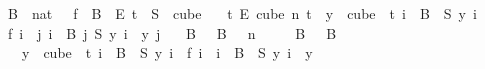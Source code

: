 \begin{isabellebody}
\ \ {\isasymnotin}\ B\ {\isacharbackquote}{\kern0pt}\ {\isacharbraceleft}{\kern0pt}{\isachardot}{\kern0pt}{\isachardot}{\kern0pt}{\isacharless}{\kern0pt}{}{\isacharcolon}{\kern0pt}{\isacharcolon}{\kern0pt}nat{\isacharbraceright}{\kern0pt}{\isacharparenright}{\kern0pt}{\isachardoublequoteclose}\ \ \ {\isachardoublequoteopen}f\ {\isasymin}\ {\isacharparenleft}{\kern0pt}B\ {}{\isacharparenright}{\kern0pt}\ {\isasymrightarrow}\isactrlsub E\ {\isacharbraceleft}{\kern0pt}{\isachardot}{\kern0pt}{\isachardot}{\kern0pt}{\isacharless}{\kern0pt}t{\isacharbraceright}{\kern0pt}{\isachardoublequoteclose}\ \ {\isachardoublequoteopen}S\ {\isasymin}\ {\isacharparenleft}{\kern0pt}cube\ {}\isanewline
\ \ t{\isacharparenright}{\kern0pt}\ {\isasymrightarrow}\isactrlsub E\ {\isacharparenleft}{\kern0pt}cube\ n\ t{\isacharparenright}{\kern0pt}{\isachardoublequoteclose}\ \ {\isachardoublequoteopen}{\isacharparenleft}{\kern0pt}{\isasymforall}y\ {\isasymin}\ cube\ {}\ t{\isachardot}{\kern0pt}\ {\isacharparenleft}{\kern0pt}{\isasymforall}i\ {\isasymin}\ B\ {}{\isachardot}{\kern0pt}\ S\ y\ i\isanewline
\ \ {\isacharequal}{\kern0pt}\ f\ i{\isacharparenright}{\kern0pt}\ {\isasymand}\ {\isacharparenleft}{\kern0pt}{\isasymforall}j{\isacharless}{\kern0pt}{}{\isachardot}{\kern0pt}\ {\isasymforall}i\ {\isasymin}\ B\ j{\isachardot}{\kern0pt}\ {\isacharparenleft}{\kern0pt}S\ y{\isacharparenright}{\kern0pt}\ i\ {\isacharequal}{\kern0pt}\ y\ j{\isacharparenright}{\kern0pt}{\isacharparenright}{\kern0pt}{\isachardoublequoteclose}\isanewline
\ \ \ {\isachardoublequoteopen}B\ {}\ {\isasymunion}\ B\ {}\ {\isacharequal}{\kern0pt}\ {\isacharbraceleft}{\kern0pt}{\isachardot}{\kern0pt}{\isachardot}{\kern0pt}{\isacharless}{\kern0pt}n{\isacharbraceright}{\kern0pt}{\isachardoublequoteclose}\isanewline
\ \ \ \ \ {\isachardoublequoteopen}B\ {}\ {\isasyminter}\ B\ {}\ {\isacharequal}{\kern0pt}\ {\isacharbraceleft}{\kern0pt}{\isacharbraceright}{\kern0pt}{\isachardoublequoteclose}\isanewline
\ \ \ \ \ {\isachardoublequoteopen}{\isacharparenleft}{\kern0pt}{\isasymforall}y\ {\isasymin}\ cube\ {}\ t{\isachardot}{\kern0pt}\ {\isacharparenleft}{\kern0pt}{\isasymforall}i\ {\isasymin}\ B\ {}{\isachardot}{\kern0pt}\ S\ y\ i\ {\isacharequal}{\kern0pt}\ f\ i{\isacharparenright}{\kern0pt}\ {\isasymand}\ {\isacharparenleft}{\kern0pt}{\isasymforall}i\ {\isasymin}\ B\ {}{\isachardot}{\kern0pt}\ {\isacharparenleft}{\kern0pt}S\ y{\isacharparenright}{\kern0pt}\ i\ {\isacharequal}{\kern0pt}\ y\ {}{\isacharparenright}{\kern0pt}{\isacharparenright}{\kern0pt}{\isachardoublequoteclose}\isanewline

\end{isabellebody}

